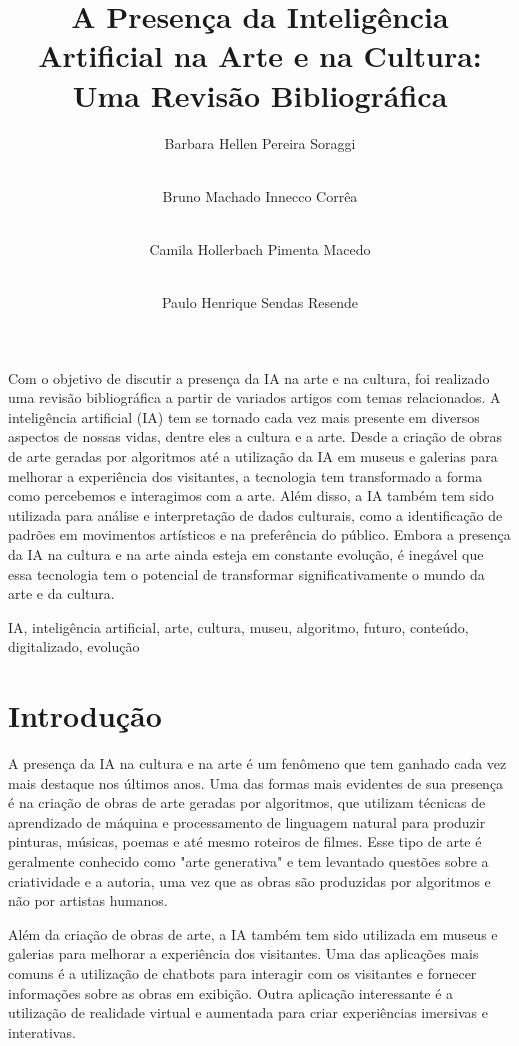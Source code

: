 \documentclass[12pt]{article}
\title{A Presença da Inteligência Artificial na Arte e na Cultura: Uma Revisão Bibliográfica}
\author{
    \small Barbara Hellen Pereira Soraggi\and\\
    \small Bruno Machado Innecco Corrêa\and\\
    \small Camila Hollerbach Pimenta Macedo\and\\
    \small Paulo Henrique Sendas Resende\\
}
\begin{document}
 
	
	\maketitle
	
	\begin{resumo} 
		Com o objetivo de discutir a presença da IA na arte e na cultura, foi realizado uma revisão bibliográfica a partir de variados artigos com temas relacionados. A inteligência artificial (IA) tem se tornado cada vez mais presente em diversos aspectos de nossas vidas, dentre eles a cultura e a arte. Desde a criação de obras de arte geradas por algoritmos até a utilização da IA em museus e galerias para melhorar a experiência dos visitantes, a tecnologia tem transformado a forma como percebemos e interagimos com a arte. Além disso, a IA também tem sido utilizada para análise e interpretação de dados culturais, como a identificação de padrões em movimentos artísticos e na preferência do público. Embora a presença da IA na cultura e na arte ainda esteja em constante evolução, é inegável que essa tecnologia tem o potencial de transformar significativamente o mundo da arte e da cultura.

	\end{resumo}

 \begin{palavras chaves} 
		IA, inteligência artificial, arte, cultura, museu, algoritmo, futuro, conteúdo, digitalizado, evolução

	\end{palavras chaves}
	
	\section{Introdução}
	\label{sec:introducao}
	
	A presença da IA na cultura e na arte é um fenômeno que tem ganhado cada vez mais destaque nos últimos anos. Uma das formas mais evidentes de sua presença é na criação de obras de arte geradas por algoritmos, que utilizam técnicas de aprendizado de máquina e processamento de linguagem natural para produzir pinturas, músicas, poemas e até mesmo roteiros de filmes. Esse tipo de arte é geralmente conhecido como "arte generativa" e tem levantado questões sobre a criatividade e a autoria, uma vez que as obras são produzidas por algoritmos e não por artistas humanos.

    Além da criação de obras de arte, a IA também tem sido utilizada em museus e galerias para melhorar a experiência dos visitantes. Uma das aplicações mais comuns é a utilização de chatbots para interagir com os visitantes e fornecer informações sobre as obras em exibição. Outra aplicação interessante é a utilização de realidade virtual e aumentada para criar experiências imersivas e interativas.
    
\end{document}
